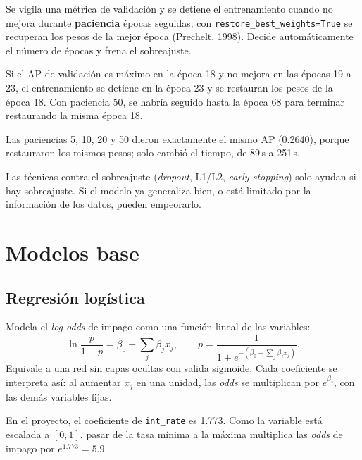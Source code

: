 \documentclass[11pt,a4paper]{article}
\newcommand{\code}[1]{\texttt{#1}}
\begin{document}
Se vigila una métrica de validación y se detiene el entrenamiento cuando no mejora durante \textbf{paciencia} épocas seguidas; con \code{restore\_best\_weights=True} se recuperan los pesos de la mejor época (Prechelt, 1998). Decide automáticamente el número de épocas y frena el sobreajuste.

\begin{ejemplo}[: paciencia 5]
Si el AP de validación es máximo en la época 18 y no mejora en las épocas 19 a 23, el entrenamiento se detiene en la época 23 y se restauran los pesos de la época 18. Con paciencia 50, se habría seguido hasta la época 68 para terminar restaurando la misma época 18.
\end{ejemplo}

\begin{proyecto}
Las paciencias 5, 10, 20 y 50 dieron exactamente el mismo AP (0.2640), porque restauraron los mismos pesos; solo cambió el tiempo, de 89\,s a 251\,s.
\end{proyecto}

\begin{clave}
Las técnicas contra el sobreajuste (\textit{dropout}, L1/L2, \textit{early stopping}) solo ayudan si hay sobreajuste. Si el modelo ya generaliza bien, o está limitado por la información de los datos, pueden empeorarlo.
\end{clave}

\section{Modelos base}

\subsection{Regresión logística}

Modela el \textit{log-odds} de impago como una función lineal de las variables:
\begin{equation}
\ln\frac{p}{1-p} = \beta_0 + \sum_j \beta_j x_j, \qquad p=\frac{1}{1+e^{-(\beta_0+\sum_j\beta_jx_j)}} .
\end{equation}
Equivale a una red sin capas ocultas con salida sigmoide. Cada coeficiente se interpreta así: al aumentar $x_j$ en una unidad, las \textit{odds} se multiplican por $e^{\beta_j}$, con las demás variables fijas.

\begin{ejemplo}
En el proyecto, el coeficiente de \code{int\_rate} es 1.773. Como la variable está escalada a $[0,1]$, pasar de la tasa mínima a la máxima multiplica las \textit{odds} de impago por $e^{1.773}=5.9$.
\end{ejemplo}
\end{document}
